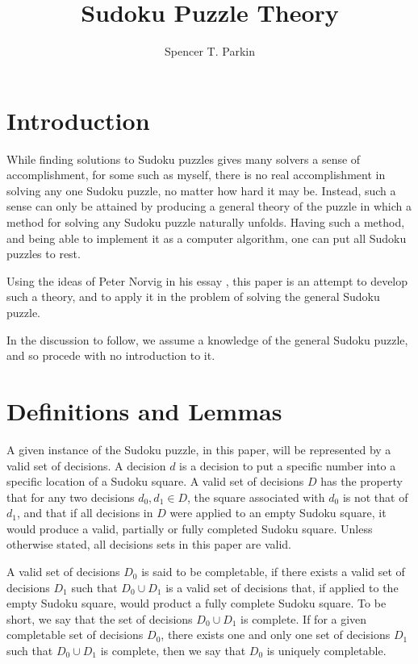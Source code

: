 \documentclass[12pt]{article}
\title{Sudoku Puzzle Theory}
\author{Spencer T. Parkin}
\numberwithin{equation}{section}
\begin{document}
\maketitle

\section{Introduction}

While finding solutions to Sudoku puzzles gives many solvers a sense of accomplishment, for some
such as myself, there is no real accomplishment in solving any one Sudoku puzzle,
no matter how hard it may be.  Instead, such a sense can only be attained by
producing a general theory of the puzzle in which a method for solving
any Sudoku puzzle naturally unfolds.  Having such a method, and being able
to implement it as a computer algorithm, one can put all Sudoku puzzles to rest.

Using the ideas of Peter Norvig in
his essay \cite{}, this paper is an attempt to develop such a theory, and
to apply it in the problem of solving the general Sudoku puzzle.

In the discussion to follow, we assume a knowledge of the general Sudoku puzzle,
and so procede with no introduction to it.

\section{Definitions and Lemmas}

A given instance of the Sudoku puzzle, in this paper, will be represented by a
valid set of decisions.
A decision $d$ is a decision to put a specific number into a specific
location of a Sudoku square.
A valid set of decisions $D$ has the property that for any two decisions
$d_0,d_1\in D$, the square associated with $d_0$ is not that of $d_1$,
and that if all decisions in $D$ were applied to an empty Sudoku square,
it would produce a valid, partially or fully completed Sudoku square.
Unless otherwise stated, all decisions sets in this paper are valid.

A valid set of decisions $D_0$ is said to be completable, if there exists
a valid set of decisions $D_1$ such that $D_0\cup D_1$ is a valid set of decisions
that, if applied to the empty Sudoku square, would product a
fully complete Sudoku square.  To be short, we say that the set of decisions
$D_0\cup D_1$ is complete.  If for a given completable set of decisions $D_0$, there
exists one and only one set of decisions $D_1$ such that $D_0\cup D_1$ is complete,
then we say that $D_0$ is uniquely completable.
\end{document}
